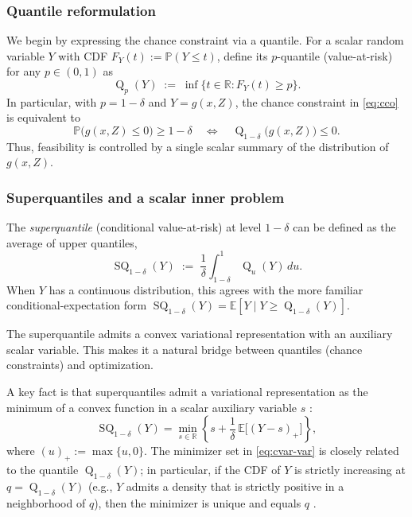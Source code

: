 \documentclass{uai2026} %
\theoremstyle{plain}
\theoremstyle{definition}
\newcommand{\SQ}{\operatorname{SQ}}
\newcommand{\Q}{\operatorname{Q}}
\begin{document}
\subsubsection{Quantile reformulation}
We begin by expressing the chance constraint via a quantile.
For a scalar random variable $Y$ with CDF $F_Y(t):=\mathbb{P}(Y\le t)$, define its $p$-quantile (value-at-risk) for any $p\in(0,1)$ as
\begin{equation}
  \Q_{p}(Y)\;:=\;\inf\{t\in\mathbb{R}: F_Y(t)\ge p\}.\label{eq:quantile-def}
\end{equation}
In particular, with $p=1-\delta$ and $Y=g(x,Z)$, the chance constraint in \eqref{eq:cco} is equivalent to
\begin{equation}
  \mathbb{P}\big(g(x,Z)\le 0\big)\ge 1-\delta
  \quad\Longleftrightarrow\quad
  \Q_{1-\delta}\big(g(x,Z)\big)\le 0.\label{eq:quantile}
\end{equation}
Thus, feasibility is controlled by a single scalar summary of the distribution of $g(x,Z)$.

\subsubsection{Superquantiles and a scalar inner problem}
The \emph{superquantile} (conditional value-at-risk) at level $1-\delta$ can be defined as the average of upper quantiles,
\begin{equation}
  \SQ_{1-\delta}(Y)\;:=\;\frac{1}{\delta}\int_{1-\delta}^1 \Q_{u}(Y)\,du.\label{eq:sq-def}
\end{equation}
When $Y$ has a continuous distribution, this agrees with the more familiar conditional-expectation form
$\SQ_{1-\delta}(Y)=\mathbb{E}[Y\mid Y\ge \Q_{1-\delta}(Y)]$.

The superquantile admits a convex variational representation with an auxiliary scalar variable.
This makes it a natural bridge between quantiles (chance constraints) and optimization.

A key fact is that superquantiles admit a variational representation as the minimum of a convex function in a scalar auxiliary variable $s$ \citep{rockafellaruryasev2000cvar}:
\begin{equation}
  \SQ_{1-\delta}(Y)=\min_{s\in\mathbb{R}} \left\{ s + \frac{1}{\delta}\,\mathbb{E}\big[(Y-s)_+\big] \right\},\label{eq:cvar-var}
\end{equation}
where $(u)_+:=\max\{u,0\}$.
The minimizer set in \eqref{eq:cvar-var} is closely related to the quantile $\Q_{1-\delta}(Y)$; in particular, if the CDF of $Y$ is strictly increasing at $q=\Q_{1-\delta}(Y)$ (e.g., $Y$ admits a density that is strictly positive in a neighborhood of $q$), then the minimizer is unique and equals $q$ \citep{rockafellaruryasev2000cvar}.
\end{document}
